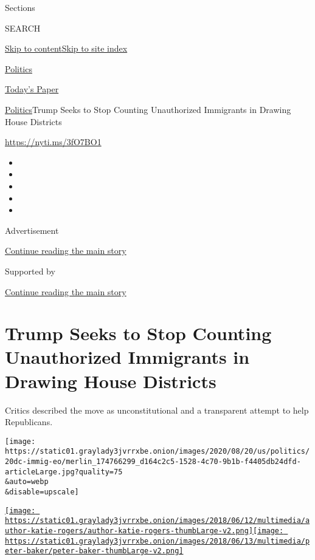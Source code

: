Sections

SEARCH

\protect\hyperlink{site-content}{Skip to
content}\protect\hyperlink{site-index}{Skip to site index}

\href{https://www.nytimes3xbfgragh.onion/section/politics}{Politics}

\href{https://myaccount.nytimes3xbfgragh.onion/auth/login?response_type=cookie\&client_id=vi}{}

\href{https://www.nytimes3xbfgragh.onion/section/todayspaper}{Today's
Paper}

\href{/section/politics}{Politics}\textbar{}Trump Seeks to Stop Counting
Unauthorized Immigrants in Drawing House Districts

\url{https://nyti.ms/3fO7BO1}

\begin{itemize}
\item
\item
\item
\item
\item
\end{itemize}

Advertisement

\protect\hyperlink{after-top}{Continue reading the main story}

Supported by

\protect\hyperlink{after-sponsor}{Continue reading the main story}

\hypertarget{trump-seeks-to-stop-counting-unauthorized-immigrants-in-drawing-house-districts}{%
\section{Trump Seeks to Stop Counting Unauthorized Immigrants in Drawing
House
Districts}\label{trump-seeks-to-stop-counting-unauthorized-immigrants-in-drawing-house-districts}}

Critics described the move as unconstitutional and a transparent attempt
to help Republicans.

\texttt{[image: https://static01.graylady3jvrrxbe.onion/images/2020/08/20/us/politics/20dc-immig-eo/merlin\_174766299\_d164c2c5-1528-4c70-9b1b-f4405db24dfd-articleLarge.jpg?quality=75\\\&auto=webp\\\&disable=upscale]}

\href{https://www.nytimes3xbfgragh.onion/by/katie-rogers}{\texttt{[image: https://static01.graylady3jvrrxbe.onion/images/2018/06/12/multimedia/author-katie-rogers/author-katie-rogers-thumbLarge-v2.png]}}\href{https://www.nytimes3xbfgragh.onion/by/peter-baker}{\texttt{[image: https://static01.graylady3jvrrxbe.onion/images/2018/06/13/multimedia/peter-baker/peter-baker-thumbLarge-v2.png]}}

